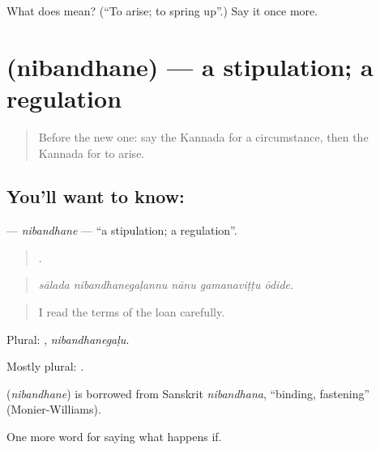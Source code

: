 \begin{tcolorbox}[breakable,colback=teal!4,colframe=teal!35!black,title={Before you move on}]
What does  mean? (\textquotedblleft{}To arise; to spring up\textquotedblright{}.) Say it once more.
\end{tcolorbox}
\section[\texorpdfstring{\kn{ನಿಬಂಧನೆ} (nibandhane)}{ನಿಬಂಧನೆ (nibandhane)}]{ (nibandhane) — a stipulation; a regulation}

\label{lesson:KA-C430-nibandhane}



\begin{quote}
Before the new one: say the Kannada for a circumstance, then the Kannada for to arise.
\end{quote}

\subsection*{You'll want to know: }
\textbf{} — \emph{nibandhane} — \textquotedblleft{}a stipulation; a regulation\textquotedblright{}.

\begin{quote}
    .
\end{quote}

\begin{quote}
\emph{sālada nibandhanegaḷannu nānu gamanaviṭṭu ōdide.}
\end{quote}

\begin{quote}
I read the terms of the loan carefully.
\end{quote}

Plural: , \emph{nibandhanegaḷu}.

Mostly plural: .

\begin{cousinweb}
\textbf{} (\emph{nibandhane}) is borrowed from Sanskrit \emph{nibandhana}, \textquotedblleft{}binding, fastening\textquotedblright{} (Monier-Williams).
\end{cousinweb}

\begin{grammarlens}[title={What you've built}]
One more word for saying what happens if.
\end{grammarlens}

